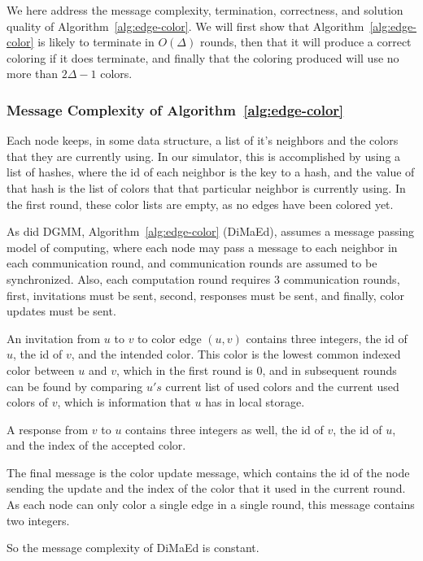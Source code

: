 \label{sec:dimaed-correct}
We here address the message complexity, termination, correctness, and solution quality of Algorithm~\ref{alg:edge-color}. We will first show that Algorithm~\ref{alg:edge-color} is likely to terminate in $O(\Delta)$ rounds, then that it will produce a correct coloring if it does terminate, and finally that the coloring produced will use no more than $2\Delta - 1$ colors.

\subsubsection{Message Complexity of Algorithm~\ref{alg:edge-color}}

Each node keeps, in some data structure, a list of it's neighbors and the colors that they are currently using. In our simulator, this is accomplished by using a list of hashes, where the id of each neighbor is the key to a hash, and the value of that hash is the list of colors that that particular neighbor is currently using. In the first round, these color lists are empty, as no edges have been colored yet.

As did DGMM, Algorithm~\ref{alg:edge-color} (DiMaEd), assumes a message passing model of computing, where each node may pass a message to each neighbor in each communication round, and communication rounds are assumed to be synchronized. Also, each computation round requires 3 communication rounds, first, invitations must be sent, second, responses must be sent, and finally, color updates must be sent.

An invitation from $u$ to $v$ to color edge $(u,v)$ contains three integers, the id of $u$, the id of $v$, and the intended color. This color is the lowest common indexed color between $u$ and $v$, which in the first round is 0, and in subsequent rounds can be found by comparing $u's$ current list of used colors and the current used colors of $v$, which is information that $u$ has in local storage.

A response from $v$ to $u$ contains three integers as well, the id of $v$, the id of $u$, and the index of the accepted color. 

The final message is the color update message, which contains the id of the node sending the update and the index of the color that it used in the current round. As each node can only color a single edge in a single round, this message contains two integers.

So the message complexity of DiMaEd is constant.

